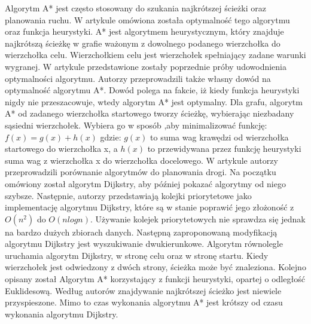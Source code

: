 \indent
Algorytm A* jest często stosowany do szukania najkrótszej ścieżki oraz planowania ruchu. W artykule \cite{dechter1985generalized} omówiona została optymalność tego algorytmu oraz funkcja heurystyki. A* jest algorytmem heurystycznym, który znajduje najkrótszą ścieżkę w grafie ważonym z dowolnego podanego wierzchołka do wierzchołka celu. Wierzchołkiem celu jest wierzchołek spełniający zadane warunki wygranej. W artykule przedstawione zostały poprzednie próby udowodnienia optymalności algorytmu. Autorzy przeprowadzili także własny dowód na optymalność algorytmu A*. Dowód polega na fakcie, iż kiedy funkcja heurystyki nigdy nie przeszacowuje, wtedy algorytm A* jest optymalny. Dla grafu, algorytm A* od zadanego wierzchołka startowego tworzy ścieżkę, wybierając niezbadany sąsiedni wierzchołek. Wybiera go w sposób ,aby minimalizować funkcję:
\newline
\newline
\begin{math} f(x) = g(x) + h(x)\end{math}
\newline
\newline
gdzie:
\newline
\newline
\begin{math} g(x) \end{math} to suma wag krawędzi od wierzchołka startowego do wierzchołka x, a
\begin{math} h(x) \end{math} to przewidywana przez funkcję heurystyki suma wag z wierzchołka x do wierzchołka docelowego.
\newline
\indent
W artykule \cite{delling2009engineering} autorzy przeprowadzili porównanie algorytmów do planowania drogi. Na początku omówiony został algorytm Dijkstry, aby później pokazać algorytmy od niego szybsze. Następnie, autorzy przedstawiają kolejki priorytetowe jako implementację algorytmu Dijkstry, które są w stanie poprawić jego złożoność z \begin{math} O(n^2) \end{math} do \begin{math} O(nlogn) \end{math}. Używanie kolejek priorytetowych nie sprawdza się jednak na bardzo dużych zbiorach danych. Następną zaproponowaną modyfikacją algorytmu Dijkstry jest wyszukiwanie dwukierunkowe. Algorytm równolegle uruchamia algorytm Dijkstry, w stronę celu oraz w stronę startu. Kiedy wierzchołek jest odwiedzony z dwóch strony, ścieżka może być znaleziona. Kolejno opisany został Algorytm A* korzystający z funkcji heurystyki, opartej o odległość Euklidesową. Według autorów znajdywanie najkrótszej ścieżko jest niewiele przyspieszone. Mimo to czas wykonania algorytmu A* jest krótszy od czasu wykonania algorytmu Dijkstry.
